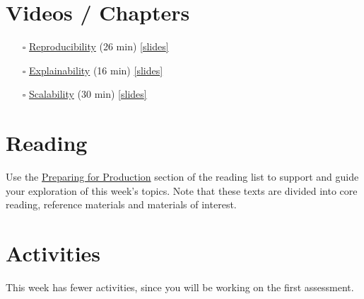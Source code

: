 \documentclass[
  letterpaper,
  DIV=11,
  numbers=noendperiod]{scrreprt}
\begin{document}
\section*{Videos / Chapters}\label{videos-chapters-3}


\begin{itemize}
\item[$\square$]
  \href{https://imperial.cloud.panopto.eu/Panopto/Pages/Viewer.aspx?id=f48d43b4-b370-4cfb-a438-af9e00bf79b5}{Reproducibility}
  (26 min)
  \href{https://github.com/zakvarty/effective-data-science-slides-2022/raw/main/04-01-reproducibility/04-01-reproducibility.pdf}{{[}slides{]}}
\item[$\square$]
  \href{https://imperial.cloud.panopto.eu/Panopto/Pages/Viewer.aspx?id=f2c64757-faea-470f-9dfc-af9e00ba4929}{Explainability}
  (16 min)
  \href{https://github.com/zakvarty/effective-data-science-slides-2022/raw/main/04-02-explainability/04-02-explainability.pdf}{{[}slides{]}}
\item[$\square$]
  \href{https://imperial.cloud.panopto.eu/Panopto/Pages/Viewer.aspx?id=5305fbb1-8dc9-4232-82d0-afa00187f942}{Scalability}
  (30 min)
  \href{https://github.com/zakvarty/effective-data-science-slides-2022/raw/main/04-03-scalability/04-03-scalability.pdf}{{[}slides{]}}
\end{itemize}

\section*{Reading}\label{reading-3}


Use the \hyperref[production-reading]{Preparing for Production} section
of the reading list to support and guide your exploration of this week's
topics. Note that these texts are divided into core reading, reference
materials and materials of interest.

\section*{Activities}\label{activities-1}


This week has fewer activities, since you will be working on the first
assessment.
\end{document}
